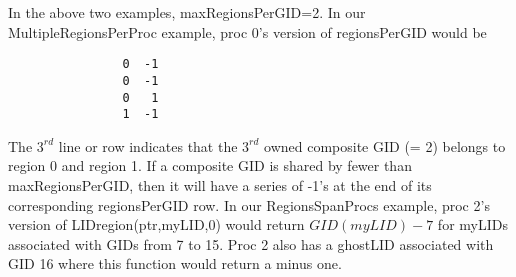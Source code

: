 \documentclass[11pt]{article}
\begin{document}
In the above two examples, {\sf maxRegionsPerGID}=2.
In our {\sf MultipleRegionsPerProc} example, proc 0's version of
{\sf regionsPerGID} would be
\vspace{-.1in}
\begin{verbatim}
                0  -1
                0  -1
                0   1
                1  -1
\end{verbatim}
\vspace{-.1in}
\noindent
The $3^{rd}$ line or row indicates that the $3^{rd}$ owned composite GID (= 2) belongs to region 0 and region 1. If a composite GID is shared by fewer than {\sf maxRegionsPerGID}, then it will have a series of -1's at the end of its corresponding {\sf regionsPerGID} row. In our {\sf RegionsSpanProcs} example, proc 2's version of  {\sf LIDregion(ptr,myLID,0)} would return $GID(myLID)-7$
for myLIDs associated with GIDs from 7 to 15. Proc 2 also has a ghostLID
associated with GID 16 where this function would return a minus one.
\end{document}
